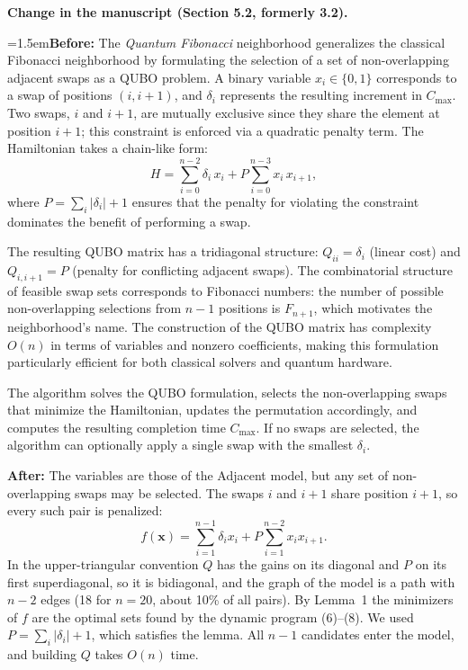 \documentclass[12pt]{article}
\newcommand{\change}[3]{\par\smallskip\noindent\textbf{Change in the manuscript (#1).}\par
  {\leftskip=1.5em\noindent\textbf{Before:} #2\par\noindent\textbf{After:} #3\par}}
\begin{document}
\change{Section 5.2, formerly 3.2}{The \emph{Quantum Fibonacci} neighborhood generalizes the classical Fibonacci neighborhood by formulating the selection of a set of non-overlapping adjacent swaps as a QUBO problem. A binary variable $x_i \in \{0,1\}$ corresponds to a swap of positions $(i, i+1)$, and $\delta_i$ represents the resulting increment in $C_{\max}$. Two swaps, $i$ and $i+1$, are mutually exclusive since they share the element at position $i+1$; this constraint is enforced via a quadratic penalty term. The Hamiltonian takes a chain-like form:
\begin{equation}
    H = \sum_{i=0}^{n-2} \delta_i\, x_i
        + P \sum_{i=0}^{n-3} x_i\, x_{i+1},
\end{equation}
where $P = \sum_i |\delta_i| + 1$ ensures that the penalty for violating the constraint dominates the benefit of performing a swap.

The resulting QUBO matrix has a tridiagonal structure: $Q_{ii} = \delta_i$ (linear cost) and $Q_{i,i+1} = P$ (penalty for conflicting adjacent swaps). The combinatorial structure of feasible swap sets corresponds to Fibonacci numbers: the number of possible non-overlapping selections from $n-1$ positions is $F_{n+1}$, which motivates the neighborhood’s name. The construction of the QUBO matrix has complexity $O(n)$ in terms of variables and nonzero coefficients, making this formulation particularly efficient for both classical solvers and quantum hardware.

The algorithm solves the QUBO formulation, selects the non-overlapping swaps that minimize the Hamiltonian, updates the permutation accordingly, and computes the resulting completion time $C_{\max}$. If no swaps are selected, the algorithm can optionally apply a single swap with the smallest $\delta_i$.}{The variables are those of the Adjacent model, but any set of non-overlapping swaps may be selected. The swaps $i$ and $i+1$ share position $i+1$, so every such pair is penalized:
\begin{equation}
f(\mathbf{x})=\sum_{i=1}^{n-1}\delta_ix_i+P\sum_{i=1}^{n-2}x_ix_{i+1}.
\end{equation}
In the upper-triangular convention $Q$ has the gains on its diagonal and $P$ on its first superdiagonal, so it is bidiagonal, and the graph of the model is a path with $n-2$ edges (18 for $n=20$, about 10\% of all pairs). By Lemma~1 the minimizers of $f$ are the optimal sets found by the dynamic program (6)--(8). We used $P=\sum_i|\delta_i|+1$, which satisfies the lemma. All $n-1$ candidates enter the model, and building $Q$ takes $O(n)$ time.}
\end{document}
